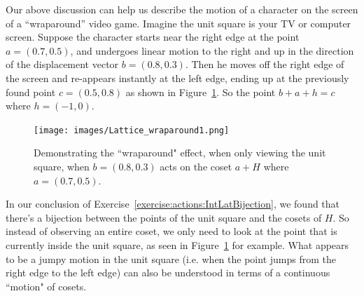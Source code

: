 Our above discussion can help us describe the motion of a character on the screen of a ``wraparound'' video game.  Imagine the unit square is your TV or computer screen. Suppose the character starts near the right edge at the point $a=(0.7,0.5)$, and undergoes linear motion to the right and up in the direction of the displacement vector $b=(0.8,0.3)$. Then he moves off the right edge of the screen and re-appears instantly at the left edge, ending up at the previously found point $c=(0.5,0.8)$ as shown in Figure~\ref{fig:wraparound1}. So the point $b+a+h=c$ where $h=(-1,0)$.

\begin{figure}[htpb]
\begin{center}
\texttt{[image: images/Lattice\_wraparound1.png]}
\caption{\label{fig:wraparound1}Demonstrating the ``wraparound" effect, when only viewing the unit square, when $b=(0.8,0.3)$ acts on the coset $a+H$ where $a=(0.7,0.5)$.}
\end{center}
\end{figure}

In our conclusion of Exercise~\ref{exercise:actions:IntLatBijection}, we found that there's a bijection between the points of the unit square and the cosets of $H$. So instead of observing an entire coset, we only need to look at the point that is currently inside the unit square, as seen in Figure~\ref{fig:wraparound1} for example. What appears to be a jumpy motion in the unit square (i.e. when the point jumps from the right edge to the left edge) can also be understood in terms of a continuous ``motion" of cosets.

